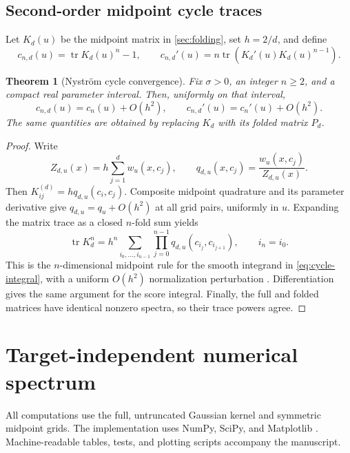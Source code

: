\documentclass[11pt]{article}
\newtheorem{theorem}{Theorem}[section]
\theoremstyle{definition}
\theoremstyle{remark}
\newcommand{\tr}{\operatorname{tr}}
\begin{document}
\subsection{Second-order midpoint cycle traces}

Let $K_d(u)$ be the midpoint matrix in \cref{sec:folding}, set $h=2/d$, and
define
\begin{equation}\label{eq:discrete-traces}
 c_{n,d}(u)=\tr K_d(u)^n-1,
 \qquad
 c_{n,d}'(u)=n\tr\left(K_d'(u)K_d(u)^{n-1}\right).
\end{equation}

\begin{theorem}[Nystr\"om cycle convergence]
\label{thm:nystrom-traces}
Fix $\sigma>0$, an integer $n\ge2$, and a compact real parameter interval.
Then, uniformly on that interval,
\begin{equation}\label{eq:trace-order}
 c_{n,d}(u)=c_n(u)+O(h^2),
 \qquad
 c_{n,d}'(u)=c_n'(u)+O(h^2).
\end{equation}
The same quantities are obtained by replacing $K_d$ with its folded matrix
$P_d$.
\end{theorem}

\begin{proof}
Write
\[
 Z_{d,u}(x)=h\sum_{j=1}^dw_u(x,c_j),
 \qquad q_{d,u}(x,c_j)=\frac{w_u(x,c_j)}{Z_{d,u}(x)}.
\]
Then $K_{ij}^{(d)}=h q_{d,u}(c_i,c_j)$.  Composite midpoint quadrature and
its parameter derivative give
$q_{d,u}=q_u+O(h^2)$ at all grid pairs, uniformly in $u$.  Expanding the
matrix trace as a closed $n$-fold sum yields
\[
 \tr K_d^n
 =h^n\sum_{i_0,\ldots,i_{n-1}}
 \prod_{j=0}^{n-1}q_{d,u}(c_{i_j},c_{i_{j+1}}),
 \qquad i_n=i_0.
\]
This is the $n$-dimensional midpoint rule for the smooth integrand in
\eqref{eq:cycle-integral}, with a uniform $O(h^2)$ normalization perturbation
\citep{Atkinson1997}.  Differentiation gives the same argument for the score
integral.  Finally, the full and folded matrices have identical nonzero
spectra, so their trace powers agree.
\end{proof}

\section{Target-independent numerical spectrum}
\label{sec:numerics}

All computations use the full, untruncated Gaussian kernel and symmetric
midpoint grids.  The implementation uses NumPy, SciPy, and Matplotlib
\citep{HarrisEtAl2020,VirtanenEtAl2020,Hunter2007}.  Machine-readable tables,
tests, and plotting scripts accompany the manuscript.
\end{document}
